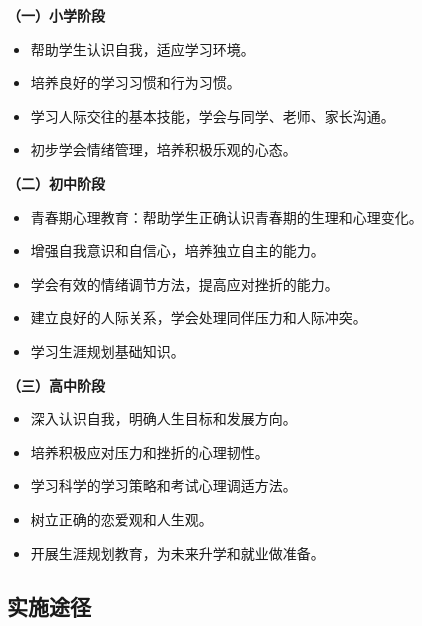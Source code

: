 \begin{keybox}
\textbf{（一）小学阶段}

\begin{itemize}[leftmargin=*]
    \item 帮助学生认识自我，适应学习环境。
    \item 培养良好的学习习惯和行为习惯。
    \item 学习人际交往的基本技能，学会与同学、老师、家长沟通。
    \item 初步学会情绪管理，培养积极乐观的心态。
\end{itemize}

\textbf{（二）初中阶段}

\begin{itemize}[leftmargin=*]
    \item 青春期心理教育：帮助学生正确认识青春期的生理和心理变化。
    \item 增强自我意识和自信心，培养独立自主的能力。
    \item 学会有效的情绪调节方法，提高应对挫折的能力。
    \item 建立良好的人际关系，学会处理同伴压力和人际冲突。
    \item 学习生涯规划基础知识。
\end{itemize}

\textbf{（三）高中阶段}

\begin{itemize}[leftmargin=*]
    \item 深入认识自我，明确人生目标和发展方向。
    \item 培养积极应对压力和挫折的心理韧性。
    \item 学习科学的学习策略和考试心理调适方法。
    \item 树立正确的恋爱观和人生观。
    \item 开展生涯规划教育，为未来升学和就业做准备。
\end{itemize}
\end{keybox}

\subsection{实施途径}

